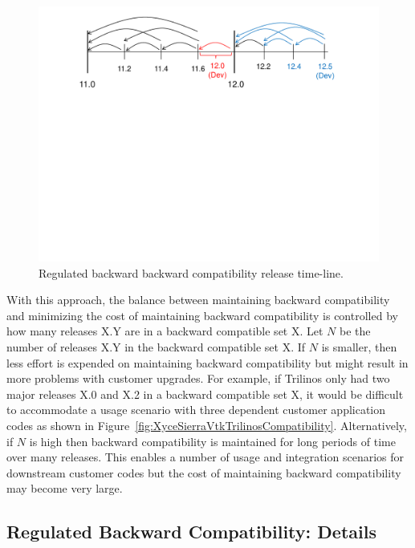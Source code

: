 \documentclass[11pt]{SANDreport}
\begin{document}
\begin{figure}
\begin{center}
\includegraphics[trim = 1.0in 5.0in 1.0in 0.2in, scale=0.55]
{BackwardCompatibilityTimeline}
{}\caption{Regulated backward backward compatibility release time-line.}
\label{fig:BackwardCompatibilityTimeline}
\end{center}
\end{figure}

With this approach, the balance between maintaining backward
compatibility and minimizing the cost of maintaining backward
compatibility is controlled by how many releases X.Y are in a
backward compatible set X.  Let $N$ be the number of releases X.Y in
the backward compatible set X.  If $N$ is smaller, then less effort is
expended on maintaining backward compatibility but might result in
more problems with customer upgrades.  For example, if Trilinos only
had two major releases X.0 and X.2 in a backward compatible set X, it
would be difficult to accommodate a usage scenario with three
dependent customer application codes as shown in
Figure~\ref{fig:XyceSierraVtkTrilinosCompatibility}.  Alternatively,
if $N$ is high then backward compatibility is maintained for long
periods of time over many releases.  This enables a number of usage
and integration scenarios for downstream customer codes but the cost
of maintaining backward compatibility may become very large.


%
{}\subsection{Regulated Backward Compatibility: Details}
\label{sec:details_reg_back_compat}
%
\end{document}
